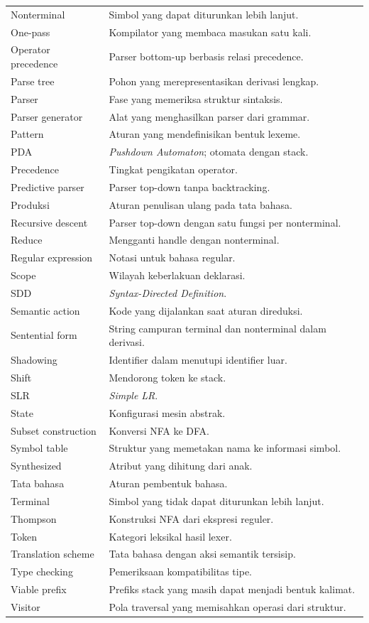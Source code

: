 {\begin{longtable}{@{}p{3.8cm}p{10.8cm}@{}}
Nonterminal & Simbol yang dapat diturunkan lebih lanjut. \\
One-pass & Kompilator yang membaca masukan satu kali. \\
Operator precedence & Parser bottom-up berbasis relasi precedence. \\
Parse tree & Pohon yang merepresentasikan derivasi lengkap. \\
Parser & Fase yang memeriksa struktur sintaksis. \\
Parser generator & Alat yang menghasilkan parser dari grammar. \\
Pattern & Aturan yang mendefinisikan bentuk lexeme. \\
PDA & \emph{Pushdown Automaton}; otomata dengan stack. \\
Precedence & Tingkat pengikatan operator. \\
Predictive parser & Parser top-down tanpa backtracking. \\
Produksi & Aturan penulisan ulang pada tata bahasa. \\
Recursive descent & Parser top-down dengan satu fungsi per
nonterminal. \\
Reduce & Mengganti handle dengan nonterminal. \\
Regular expression & Notasi untuk bahasa regular. \\
Scope & Wilayah keberlakuan deklarasi. \\
SDD & \emph{Syntax-Directed Definition}. \\
Semantic action & Kode yang dijalankan saat aturan direduksi. \\
Sentential form & String campuran terminal dan nonterminal dalam
derivasi. \\
Shadowing & Identifier dalam menutupi identifier luar. \\
Shift & Mendorong token ke stack. \\
SLR & \emph{Simple LR}. \\
State & Konfigurasi mesin abstrak. \\
Subset construction & Konversi NFA ke DFA. \\
Symbol table & Struktur yang memetakan nama ke informasi simbol. \\
Synthesized & Atribut yang dihitung dari anak. \\
Tata bahasa & Aturan pembentuk bahasa. \\
Terminal & Simbol yang tidak dapat diturunkan lebih lanjut. \\
Thompson & Konstruksi NFA dari ekspresi reguler. \\
Token & Kategori leksikal hasil lexer. \\
Translation scheme & Tata bahasa dengan aksi semantik tersisip. \\
Type checking & Pemeriksaan kompatibilitas tipe. \\
Viable prefix & Prefiks stack yang masih dapat menjadi bentuk
kalimat. \\
Visitor & Pola traversal yang memisahkan operasi dari struktur. \\
\end{longtable}
}
